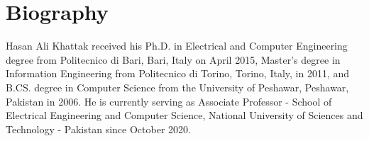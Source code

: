 \section*{Biography}
Hasan Ali Khattak received his Ph.D. in Electrical and Computer Engineering degree from Politecnico di Bari, Bari, Italy on April 2015, Master's degree in Information Engineering from Politecnico di Torino, Torino, Italy, in 2011, and B.CS. degree in Computer Science from the University of Peshawar, Peshawar, Pakistan in 2006. He is currently serving as Associate Professor - School of Electrical Engineering and Computer Science, National University of Sciences and Technology - Pakistan since October 2020.